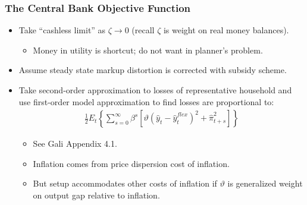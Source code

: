 \documentclass[english,xcolor=svgnames]{beamer}
\begin{document}
\begin{frame}
\frametitle{The Central Bank Objective Function}
\begin{itemize}
	\item Take ``cashless limit'' as $\zeta\rightarrow0$
(recall $\zeta$ is weight on real money balances).
	\begin{itemize}
		\item Money in utility is shortcut; do not want in planner's problem.
	\end{itemize}
	\item Assume steady state markup distortion is corrected with subsidy scheme.
	\item Take second-order approximation to losses of representative
household and use first-order model approximation to find losses are proportional to:
	\begin{align*}
		\frac{1}{2}E_t\left\{\sum_{s=0}^{\infty}\beta^s\left[\vartheta (\hat{y}_t-\hat{y}_t^{flex})^2+\hat{\pi}_{t+s}^2\right]\right\}
	\end{align*}
	\begin{itemize}
		\item See Gali Appendix 4.1.
		\item Inflation comes from price dispersion cost of inflation.
		\item But setup accommodates other costs of inflation if  $\vartheta$ is generalized weight on output gap relative to inflation.
	\end{itemize}
\end{itemize}
\end{frame}


\end{document}
